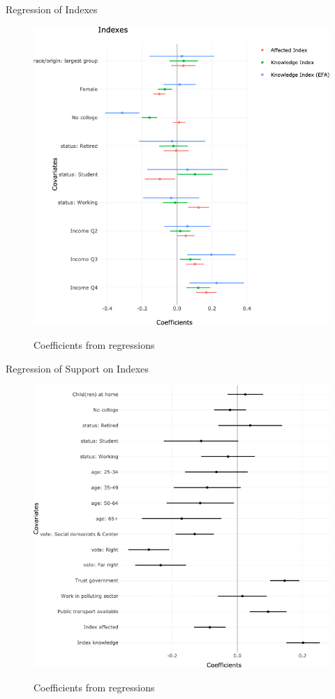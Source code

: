 \documentclass[aspectratio=169,9pt,dvipsnames]{beamer}
\begin{document}
\begin{frame}{}%
\begin{table}[h!]
\caption{Indexes}
\begin{center}
\scalebox{.33}{}
\end{center}
\end{table}
\end{frame}

\begin{frame}{}%
\begin{table}[h!]
\caption{Support with Indexes}
\begin{center}
\scalebox{.28}{}
\end{center}
\end{table}
\end{frame}


\begin{frame}{Regression of Indexes}%
\vspace{-.5cm}
\begin{figure}[h!]
\caption{Coefficients from regressions}
\includegraphics[width=.5\textwidth]{../figures/DK/coef_indexes_DK.png} \\
\end{figure}
\end{frame}


\begin{frame}{Regression of Support on Indexes}%
\vspace{-.5cm}
\begin{figure}[h!]
\caption{Coefficients from regressions}
\includegraphics[width=.5\textwidth]{../figures/DK/coef_support_indexes_DK.png} \\
\end{figure}
\end{frame}
\end{document}
